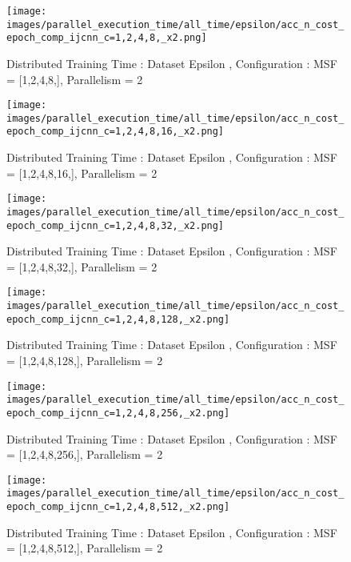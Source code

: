 \begin{figure*}[htbp]
\centering
\texttt{[image: images/parallel\_execution\_time/all\_time/epsilon/acc\_n\_cost\_epoch\_comp\_ijcnn\_c=1,2,4,8,\_x2.png]}
\caption{Distributed Training Time : Dataset Epsilon , Configuration : MSF = [1,2,4,8,], Parallelism = 2}
\label{fig:dis-msf-tr-time-epsilon-x2}
\end{figure*}


\begin{figure*}[htbp]
\centering
\texttt{[image: images/parallel\_execution\_time/all\_time/epsilon/acc\_n\_cost\_epoch\_comp\_ijcnn\_c=1,2,4,8,16,\_x2.png]}
\caption{Distributed Training Time : Dataset Epsilon , Configuration : MSF = [1,2,4,8,16,], Parallelism = 2}
\label{fig:dis-msf-tr-time-epsilon-x2}
\end{figure*}


\begin{figure*}[htbp]
\centering
\texttt{[image: images/parallel\_execution\_time/all\_time/epsilon/acc\_n\_cost\_epoch\_comp\_ijcnn\_c=1,2,4,8,32,\_x2.png]}
\caption{Distributed Training Time : Dataset Epsilon , Configuration : MSF = [1,2,4,8,32,], Parallelism = 2}
\label{fig:dis-msf-tr-time-epsilon-x2}
\end{figure*}


\begin{figure*}[htbp]
\centering
\texttt{[image: images/parallel\_execution\_time/all\_time/epsilon/acc\_n\_cost\_epoch\_comp\_ijcnn\_c=1,2,4,8,128,\_x2.png]}
\caption{Distributed Training Time : Dataset Epsilon , Configuration : MSF = [1,2,4,8,128,], Parallelism = 2}
\label{fig:dis-msf-tr-time-epsilon-x2}
\end{figure*}


\begin{figure*}[htbp]
\centering
\texttt{[image: images/parallel\_execution\_time/all\_time/epsilon/acc\_n\_cost\_epoch\_comp\_ijcnn\_c=1,2,4,8,256,\_x2.png]}
\caption{Distributed Training Time : Dataset Epsilon , Configuration : MSF = [1,2,4,8,256,], Parallelism = 2}
\label{fig:dis-msf-tr-time-epsilon-x2}
\end{figure*}


\begin{figure*}[htbp]
\centering
\texttt{[image: images/parallel\_execution\_time/all\_time/epsilon/acc\_n\_cost\_epoch\_comp\_ijcnn\_c=1,2,4,8,512,\_x2.png]}
\caption{Distributed Training Time : Dataset Epsilon , Configuration : MSF = [1,2,4,8,512,], Parallelism = 2}
\label{fig:dis-msf-tr-time-epsilon-x2}
\end{figure*}


